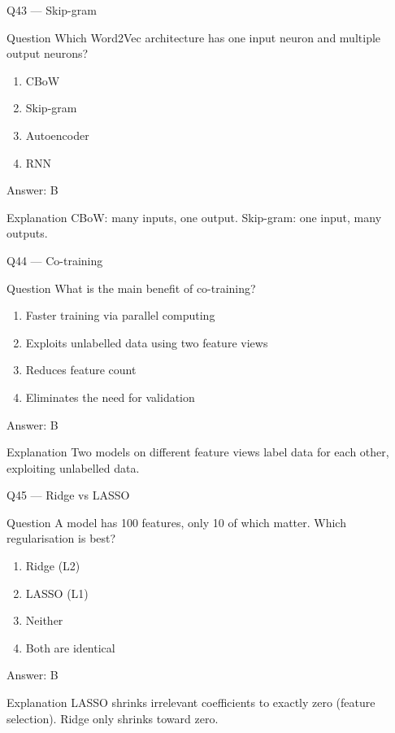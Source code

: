 \documentclass[aspectratio=169,8pt]{beamer}
\begin{document}
	\begin{frame}{Q43 --- Skip-gram}
		\begin{block}{Question}
			Which Word2Vec architecture has one input neuron and multiple output neurons?
		\end{block}
		\begin{enumerate}
			\item CBoW
			\item Skip-gram
			\item Autoencoder
			\item RNN
		\end{enumerate}
		\begin{exampleblock}{Answer: B}\end{exampleblock}
		\begin{block}{Explanation}
			CBoW: many inputs, one output. Skip-gram: one input, many outputs.
		\end{block}
	\end{frame}
	
	\begin{frame}{Q44 --- Co-training}
		\begin{block}{Question}
			What is the main benefit of co-training?
		\end{block}
		\begin{enumerate}
			\item Faster training via parallel computing
			\item Exploits unlabelled data using two feature views
			\item Reduces feature count
			\item Eliminates the need for validation
		\end{enumerate}
		\begin{exampleblock}{Answer: B}\end{exampleblock}
		\begin{block}{Explanation}
			Two models on different feature views label data for each other, exploiting unlabelled data.
		\end{block}
	\end{frame}
	
	\begin{frame}{Q45 --- Ridge vs LASSO}
		\begin{block}{Question}
			A model has 100 features, only 10 of which matter. Which regularisation is best?
		\end{block}
		\begin{enumerate}
			\item Ridge (L2)
			\item LASSO (L1)
			\item Neither
			\item Both are identical
		\end{enumerate}
		\begin{exampleblock}{Answer: B}\end{exampleblock}
		\begin{block}{Explanation}
			LASSO shrinks irrelevant coefficients to exactly zero (feature selection). Ridge only shrinks toward zero.
		\end{block}
	\end{frame}
	
\end{document}
